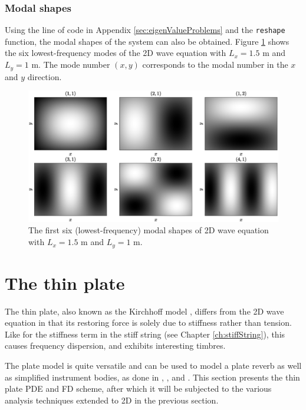 \subsubsection{Modal shapes}
Using the line of code in Appendix \ref{sec:eigenValueProblems} and the \texttt{reshape} function, the modal shapes of the system can also be obtained. Figure \ref{fig:modalShapes2D} shows the six lowest-frequency modes of the 2D wave equation with $L_x = 1.5$ m and $L_y = 1$ m. The mode number $(x,y)$ corresponds to the modal number in the $x$ and $y$ direction.

\begin{figure}[h]
    \centering
    \includegraphics[width=\textwidth]{figures/resonators/2d/modalShapes.eps}
    \caption{The first six (lowest-frequency) modal shapes of 2D wave equation with $L_x = 1.5$ m and $L_y = 1$ m.%
    \label{fig:modalShapes2D}}
\end{figure}

\section{The thin plate}\label{sec:thinPlate}
The thin plate, also known as the Kirchhoff model \cite{Kirchhoff1968}, differs from the 2D wave equation in that its restoring force is solely due to stiffness rather than tension. Like for the stiffness term in the stiff string (see Chapter \ref{ch:stiffString}), this causes frequency dispersion, and exhibits interesting timbres. 

The plate model is quite versatile and can be used to model a plate reverb \cite{DAFxChapter} as well as simplified instrument bodies, as done in \citeP[A], \citeP[B], \citeP[D] and \citeP[E]. This section presents the thin plate PDE and FD scheme, after which it will be subjected to the various analysis techniques extended to 2D in the previous section.

